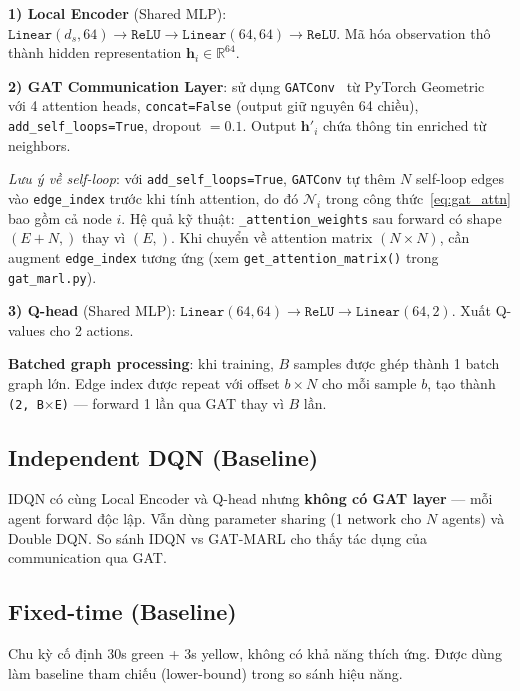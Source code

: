 \documentclass[conference]{IEEEtran}
\begin{document}
\textbf{1) Local Encoder} (Shared MLP): $\texttt{Linear}(d_s, 64) \to \texttt{ReLU} \to \texttt{Linear}(64, 64) \to \texttt{ReLU}$. Mã hóa observation thô thành hidden representation $\mathbf{h}_i \in \mathbb{R}^{64}$.

\textbf{2) GAT Communication Layer}: sử dụng \texttt{GATConv}~\cite{Velickovic2018} từ PyTorch Geometric~\cite{PyG2019} với 4 attention heads, \texttt{concat=False} (output giữ nguyên 64 chiều), \texttt{add\_self\_loops=True}, dropout $= 0.1$. Output $\mathbf{h}'_i$ chứa thông tin enriched từ neighbors.

\textit{Lưu ý về self-loop}: với \texttt{add\_self\_loops=True}, \texttt{GATConv} tự thêm $N$ self-loop edges vào \texttt{edge\_index} trước khi tính attention, do đó $\mathcal{N}_i$ trong công thức~\eqref{eq:gat_attn} bao gồm cả node $i$. Hệ quả kỹ thuật: \texttt{\_attention\_weights} sau forward có shape $(E + N,)$ thay vì $(E,)$. Khi chuyển về attention matrix $(N \times N)$, cần augment \texttt{edge\_index} tương ứng (xem \texttt{get\_attention\_matrix()} trong \texttt{gat\_marl.py}).

\textbf{3) Q-head} (Shared MLP): $\texttt{Linear}(64, 64) \to \texttt{ReLU} \to \texttt{Linear}(64, 2)$. Xuất Q-values cho 2 actions.

\textbf{Batched graph processing}: khi training, $B$ samples được ghép thành 1 batch graph lớn. Edge index được repeat với offset $b \times N$ cho mỗi sample $b$, tạo thành \texttt{(2, B$\times$E)} --- forward 1 lần qua GAT thay vì $B$ lần.

\subsection{Independent DQN (Baseline)}

IDQN có cùng Local Encoder và Q-head nhưng \textbf{không có GAT layer} --- mỗi agent forward độc lập. Vẫn dùng parameter sharing (1 network cho $N$ agents) và Double DQN. So sánh IDQN vs GAT-MARL cho thấy tác dụng của communication qua GAT.

\subsection{Fixed-time (Baseline)}

Chu kỳ cố định 30s green + 3s yellow, không có khả năng thích ứng. Được dùng làm baseline tham chiếu (lower-bound) trong so sánh hiệu năng.

\end{document}
